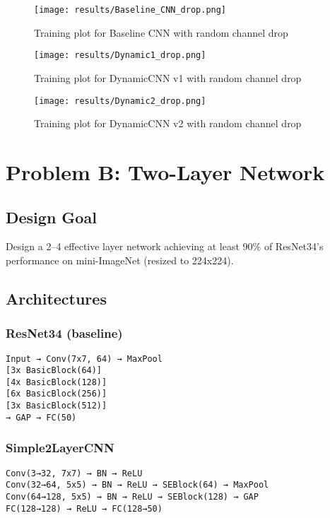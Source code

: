 \documentclass[12pt]{article}
\begin{document}
\begin{figure}[H]
\centering
\texttt{[image: results/Baseline\_CNN\_drop.png]}
\caption{Training plot for Baseline CNN  with random channel drop}
\end{figure}

\begin{figure}[H]
\centering
\texttt{[image: results/Dynamic1\_drop.png]}
\caption{Training plot for DynamicCNN v1 with random channel drop}
\end{figure}

\begin{figure}[H]
\centering
\texttt{[image: results/Dynamic2\_drop.png]}
\caption{Training plot for DynamicCNN v2 with random channel drop}
\end{figure}

\section*{Problem B: Two-Layer Network}

\subsection*{Design Goal}
Design a 2--4 effective layer network achieving at least 90\% of ResNet34's performance on mini-ImageNet (resized to 224x224).

\subsection*{Architectures}

\subsubsection*{ResNet34 (baseline)}
\begin{Verbatim}
Input → Conv(7x7, 64) → MaxPool
[3x BasicBlock(64)]
[4x BasicBlock(128)]
[6x BasicBlock(256)]
[3x BasicBlock(512)]
→ GAP → FC(50)
\end{Verbatim}

\subsubsection*{Simple2LayerCNN}
\begin{Verbatim}
Conv(3→32, 7x7) → BN → ReLU
Conv(32→64, 5x5) → BN → ReLU → SEBlock(64) → MaxPool
Conv(64→128, 5x5) → BN → ReLU → SEBlock(128) → GAP
FC(128→128) → ReLU → FC(128→50)
\end{Verbatim}
\end{document}

